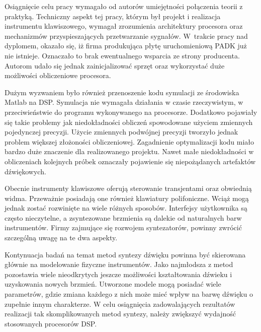 Osiągnięcie celu pracy wymagało od autorów umiejętności połączenia teorii z praktyką. Techniczny aspekt tej pracy, którym był projekt i realizacja instrumentu klawiszowego, wymagał zrozumienia architektury procesora oraz mechanizmów przyspieszających przetwarzanie sygnałów. 
W~trakcie pracy nad dyplomem, okazało się, iż firma produkująca płytę uruchomieniową PADK już nie istnieje. Oznaczało to brak ewentualnego wsparcia ze strony producenta. Autorom udało się jednak zainicjalizować sprzęt oraz wykorzystać duże możliwości obliczeniowe procesora.

Dużym wyzwaniem było również przenoszenie kodu symulacji ze środowiska Matlab na DSP. Symulacja nie wymagała działania w czasie rzeczywistym, w przeciwieństwie do programu wykonywanego na procesorze. Dodatkowo pojawiały się takie problemy jak niedokładności obliczeń spowodowane użyciem zmiennych pojedynczej precyzji. Użycie zmiennych podwójnej precyzji tworzyło jednak problem większej złożoności obliczeniowej. Zagadnienie optymalizacji kodu miało bardzo duże znaczenie dla realizowanego projektu. Nawet małe niedokładności w obliczeniach kolejnych próbek oznaczały pojawienie się niepożądanych artefaktów dźwiękowych.

Obecnie instrumenty klawiszowe oferują sterowanie transjentami oraz obwiednią widma. Przeważnie posiadają one również klawiatury polifoniczne. Wciąż mogą jednak zostać rozwinięte na wiele różnych sposobów. Interfejsy użytkownika są często nieczytelne, a zsyntezowane brzmienia są dalekie od naturalnych barw instrumentów. Firmy zajmujące się rozwojem syntezatorów, powinny zwrócić szczególną uwagę na te dwa aspekty.

Kontynuacja badań na temat metod syntezy dźwięku powinna być skierowana głównie na modelowanie fizyczne instrumentów. Jako najmłodsza z metod pozostawia wiele nieodkrytych jeszcze możliwości kształtowania dźwieku i uzyskowania nowych brzmień. Utworzone modele mogą posiadać wiele parametrów, gdzie zmiana każdego z nich może mieć wpływ na barwę dźwięku o zupełnie innym charakterze. W celu osiągnięcia zadowalających rezultatów realizacji tak skomplikowanych metod syntezy, należy zwiększyć wydajność stosowanych procesorów DSP.
